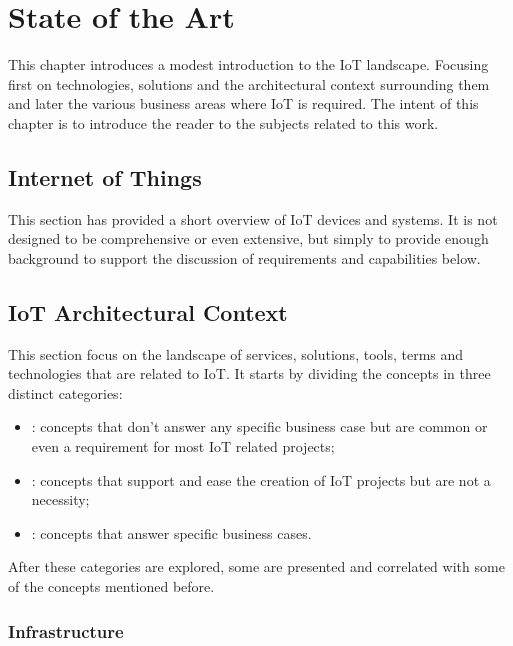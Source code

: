 \chapter{State of the Art}
\label{chap:stateofart}

This chapter introduces a modest introduction to the \gls{IoT} landscape. Focusing first on technologies, solutions and the architectural context surrounding them and later the various business areas where \gls{IoT} is required.
The intent of this chapter is to introduce the reader to the subjects related to this work.

\section{Internet of Things}
\label{sec:stateofart:iot}

This section has provided a short overview of IoT devices and systems. It is not designed to be comprehensive or even extensive, but simply to provide enough background to support the discussion of requirements and capabilities below.

\section{IoT Architectural Context}
\label{sec:stateofart:arch}

This section focus on the landscape of services, solutions, tools, terms and technologies that are related to \gls{IoT}.
It starts by dividing the concepts in three distinct categories:

\begin{itemize}
    \item {}: concepts that don't answer any specific business case but are common or even a requirement for most \gls{IoT} related projects; 
    \item {}: concepts that support and ease the creation of \gls{IoT} projects but are not a necessity;
    \item {}: concepts that answer specific business cases.
\end{itemize}

After these categories are explored, some  are presented and correlated with some of the concepts mentioned before.

\subsection{Infrastructure} %
\label{subsec:stateofart:arch:infra}

